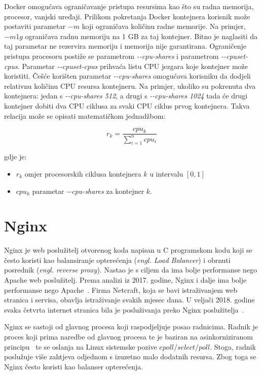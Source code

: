 Docker omogućava ograničavanje pristupa resursima kao što su radna memorija, procesor, vanjski
uređaji. Prilikom pokretanja Docker kontejnera korisnik može postaviti parametar $-m$ koji
ograničava količinu radne memorije. Na primjer, $-m 1g$ ograničava radnu memoriju na 1 GB za taj
kontejner. Bitno je naglasiti da taj parametar ne rezervira memoriju i memorija nije garantirana.
Ograničenje pristupa procesoru postiže se parametrom \textit{-{}-cpu-shares} i parametrom
\textit{-{}-cpuset-cpus}.  Parametar \textit{-{}-cpuset-cpus} prihvaća listu CPU jezgara koje
kontejner može koristiti. Češće korišten parametar \textit{-{}-cpu-shares} omogućava korisniku da
dodjeli relativnu količinu CPU resursa kontejneru.  Na primjer, ukoliko su pokrenuta dva kontejnera:
jedan s \textit{-{}-cpu-shares 512}, a drugi s \textit{-{}-cpu-shares 1024} tada će drugi kontejner
dobiti dva CPU ciklusa za svaki CPU ciklus prvog kontejnera. Takva relacija može se opisati
matematičkom jednadžbom:

\begin{equation*}
        r_k = \frac{cpu_k} {\sum_{i=1}^{n} cpu_i}
\end{equation*}

gdje je:

\begin{itemize}
    \item $r_k$ omjer procesorskih ciklusa kontejnera $k$ u intervalu $[0, 1]$
    \item $cpu_k$ parametar \textit{-{}-cpu-shares} za kontejner $k$.
\end{itemize}

\section{Nginx}
Nginx je web poslužitelj otvorenog koda napisan u C programskom kodu koji se često koristi kao
balansiranje opterećenja (\textit{engl. Load Balancer}) i obrnuti posrednik (\textit{engl. reverse
proxy}). Nastao je s ciljem da ima bolje performanse nego Apache web poslužitelj. Prema analizi iz
2017. godine, Nginx i dalje ima bolje performanse nego Apache~\citep{nguyen2017comparative}.
Firma Netcraft, koja se bavi istraživanjem web stranica i servisa, obavlja istraživanje svakih
mjesec dana. U veljači 2018. godine svaka četvrta internet stranica bila je posluživanja preko Nginx
poslužitelja~\citep{Netcraft2018}.

Nginx se sastoji od glavnog procesa koji raspodjeljuje posao radnicima. Radnik je proces koji prima
naredbe od glavnog procesa te je baziran na asinkorniziranom principu~\citep{reese2008nginx} te se
oslanja na Linux sistemske pozive $epoll/select/poll$. Stoga, radnik poslužuje više zahtjeva
odjednom s izuzetno malo dodatnih resursa. Zbog toga se Nginx često koristi kao balanser
opterećenja.

